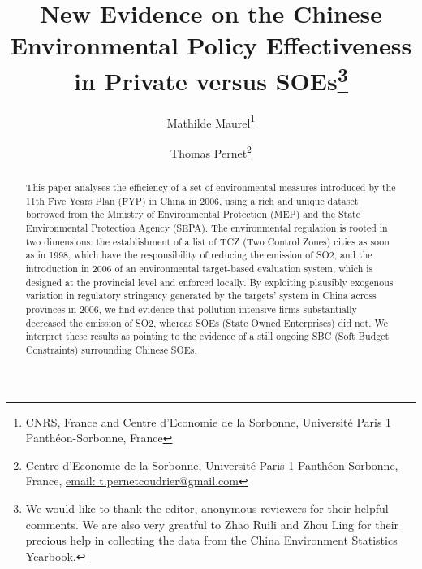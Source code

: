 \documentclass[12pt]{article}
\begin{document}
\begin{titlepage}


\title{New Evidence on the Chinese Environmental Policy Effectiveness in Private versus SOEs\thanks{We would like to thank the editor, anonymous reviewers for their helpful comments. We are also very greatful to Zhao Ruili and Zhou Ling for their precious help in collecting the data from the China Environment Statistics Yearbook.}}
\author{
Mathilde Maurel\thanks{CNRS, France and Centre d'Economie de la Sorbonne, Université Paris 1 Panthéon-Sorbonne, France} 
\and Thomas Pernet\thanks{Centre d'Economie de la Sorbonne, Université Paris 1 Panthéon-Sorbonne, France,
\href{mailto:t.pernetcoudrier@gmail.com}{email: t.pernetcoudrier@gmail.com} 
}
}

\date{}

\maketitle
\begin{abstract}
\noindent This paper analyses the efficiency of a set of environmental measures introduced by the 11th Five Years Plan (FYP) in China in 2006, using a rich and unique dataset borrowed from the Ministry of Environmental Protection (MEP) and the State Environmental Protection Agency (SEPA). The environmental regulation is rooted in two dimensions: the establishment of a list of TCZ (Two Control Zones) cities as soon as in 1998, which have the responsibility of reducing the emission of SO2, and the introduction in 2006 of an environmental target-based evaluation system, which is designed at the provincial level and enforced locally. By exploiting plausibly exogenous variation in regulatory stringency generated by the targets' system in China across provinces in 2006, we find evidence that pollution-intensive firms substantially decreased the emission of SO2, whereas SOEs (State Owned Enterprises) did not. We interpret these results as pointing to the evidence of a still ongoing SBC (Soft Budget Constraints) surrounding Chinese SOEs. 


\end{abstract}
\end{titlepage}
\end{document}

